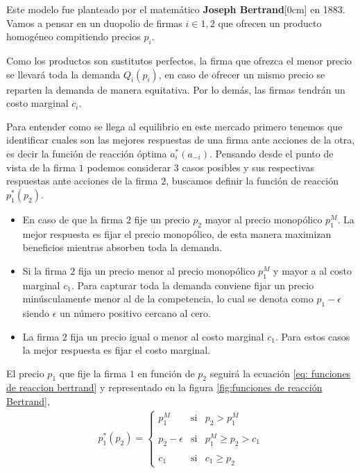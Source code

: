 Este modelo fue planteado por el matemático \textbf{Joseph Bertrand}[0cm] en 1883. Vamos a pensar en un duopolio de firmas $i\in 1,2$ que ofrecen un producto homogéneo compitiendo precios $p_i$. 

Como los productos son sustitutos perfectos, la firma que ofrezca el menor precio se llevará toda la demanda $Q_i(p_i)$, en caso de ofrecer un mismo precio se reparten la demanda de manera equitativa. Por lo demás, las firmas tendrán un costo marginal $c_i$. 

Para entender como se llega al equilibrio en este mercado primero tenemos que identificar cuales son las mejores respuestas de una firma ante acciones de la otra, es decir la función de reacción óptima $a^*_i(a_{-i})$. Pensando desde el punto de vista de la firma $1$ podemos considerar 3 casos posibles y sus respectivas respuestas ante acciones de la firma $2$, buscamos definir la función de reacción $p^*_1(p_2)$.

\begin{itemize}
    \item En caso de que la firma $2$ fije un precio $p_2$ mayor al precio monopólico $p_1^M$. La mejor respuesta es fijar el precio monopólico, de esta manera maximizan beneficios mientras absorben toda la demanda.
    \item Si la firma $2$ fija un precio menor al precio monopólico $p_1^M$ y mayor a al costo marginal $c_1$. Para capturar toda la demanda conviene fijar un precio minúsculamente menor al de la competencia, lo cual se denota como $p_1-\epsilon$ siendo $\epsilon$ un número positivo cercano al cero.
    \item La firma $2$ fija un precio igual o menor al costo marginal $c_1$. Para estos casos la mejor respuesta es fijar el costo marginal.
\end{itemize}

El precio $p_1$ que fije la firma $1$ en función de $p_2$ seguirá la ecuación \ref{eq: funciones de reaccion bertrand} y representado en la figura \ref{fig:funciones de reacción Bertrand},
\begin{align}
    p^*_1(p_2)= \left\{ \begin{array}{lcc} p_1^M & \text{si} &  p_2> p_1^M  \\ \\ p_2-\epsilon & \text{si} & p_1^M \geq p_2>c_1 \\ \\ c_1 & \text{si} & c_1 \geq p_2  \end{array} \right. \label{eq: funciones de reaccion bertrand}
\end{align}

